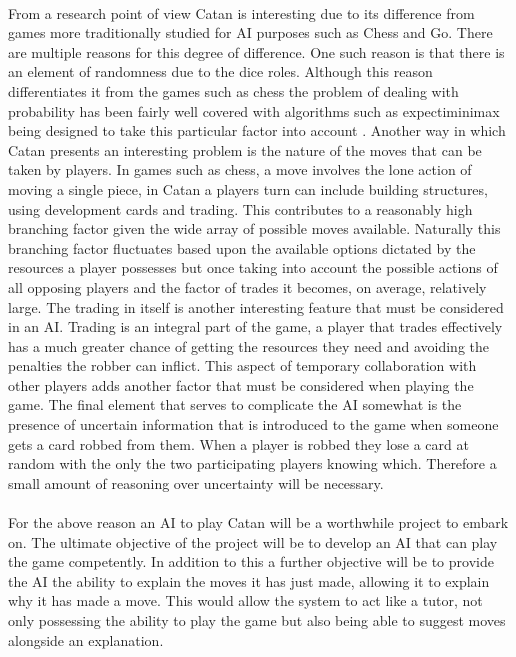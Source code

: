 \documentclass[]{article}
\begin{document}
\paragraph{}
From a research point of view Catan is interesting due to its difference from games more traditionally studied for AI purposes such as Chess and Go. There are multiple reasons for this degree of difference. One such reason is that there is an element of randomness due to the dice roles. Although this reason differentiates it from the games such as chess the problem of dealing with probability has been fairly well covered with algorithms such as expectiminimax being designed to take this particular factor into account \autocite{melko2007optimal}. Another way in which Catan presents an interesting problem is the nature of the moves that can be taken by players. In games such as chess, a move involves the lone action of moving a single piece, in Catan a players turn can include building structures, using development cards and trading. This contributes to a reasonably high branching factor given the wide array of possible moves available. Naturally this branching factor fluctuates based upon the available options dictated by the resources a player possesses but once taking into account the possible actions of all opposing players and the factor of trades it becomes, on average, relatively large. The trading in itself is another interesting feature that must be considered in an AI. Trading is an integral part of the game, a player that trades effectively has a much greater chance of getting the resources they need and avoiding the penalties the robber can inflict. This aspect of temporary collaboration with other players adds another factor that must be considered when playing the game. The final element that serves to complicate the AI somewhat is the presence of uncertain information that is introduced to the game when someone gets a card robbed from them. When a player is robbed they lose a card at random with the only the two participating players knowing which. Therefore a small amount of reasoning over uncertainty will be necessary.

\paragraph{}
For the above reason an AI to play Catan will be a worthwhile project to embark on. The ultimate objective of the project will be to develop an AI that can play the game competently. In addition to this a further objective will be to provide the AI the ability to explain the moves it has just made, allowing it to explain why it has made a move. This would allow the system to act like a tutor, not only possessing the ability to play the game but also being able to suggest moves alongside an explanation. 
\end{document}
